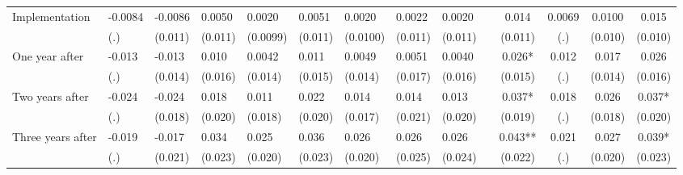 \begin{tabular}{lccccrrrrrcccc}
Implementation & \multicolumn{1}{l}{-0.0084} & \multicolumn{1}{l}{-0.0086} & \multicolumn{1}{l}{0.0050} & \multicolumn{1}{l}{0.0020} & \multicolumn{1}{l}{0.0051} & \multicolumn{1}{l}{0.0020} & \multicolumn{1}{l}{0.0022} & \multicolumn{1}{l}{0.0020} &       & 0.014 & 0.0069 & 0.0100 & 0.015 \\
      & \multicolumn{1}{l}{(.)} & \multicolumn{1}{l}{(0.011)} & \multicolumn{1}{l}{(0.011)} & \multicolumn{1}{l}{(0.0099)} & \multicolumn{1}{l}{(0.011)} & \multicolumn{1}{l}{(0.0100)} & \multicolumn{1}{l}{(0.011)} & \multicolumn{1}{l}{(0.011)} &       & (0.011) & (.)   & (0.010) & (0.010) \\
One year after & \multicolumn{1}{l}{-0.013} & \multicolumn{1}{l}{-0.013} & \multicolumn{1}{l}{0.010} & \multicolumn{1}{l}{0.0042} & \multicolumn{1}{l}{0.011} & \multicolumn{1}{l}{0.0049} & \multicolumn{1}{l}{0.0051} & \multicolumn{1}{l}{0.0040} &       & 0.026* & 0.012 & 0.017 & 0.026 \\
      & \multicolumn{1}{l}{(.)} & \multicolumn{1}{l}{(0.014)} & \multicolumn{1}{l}{(0.016)} & \multicolumn{1}{l}{(0.014)} & \multicolumn{1}{l}{(0.015)} & \multicolumn{1}{l}{(0.014)} & \multicolumn{1}{l}{(0.017)} & \multicolumn{1}{l}{(0.016)} &       & (0.015) & (.)   & (0.014) & (0.016) \\
Two years after & \multicolumn{1}{l}{-0.024} & \multicolumn{1}{l}{-0.024} & \multicolumn{1}{l}{0.018} & \multicolumn{1}{l}{0.011} & \multicolumn{1}{l}{0.022} & \multicolumn{1}{l}{0.014} & \multicolumn{1}{l}{0.014} & \multicolumn{1}{l}{0.013} &       & 0.037* & 0.018 & 0.026 & 0.037* \\
      & \multicolumn{1}{l}{(.)} & \multicolumn{1}{l}{(0.018)} & \multicolumn{1}{l}{(0.020)} & \multicolumn{1}{l}{(0.018)} & \multicolumn{1}{l}{(0.020)} & \multicolumn{1}{l}{(0.017)} & \multicolumn{1}{l}{(0.021)} & \multicolumn{1}{l}{(0.020)} &       & (0.019) & (.)   & (0.018) & (0.020) \\
Three years after & \multicolumn{1}{l}{-0.019} & \multicolumn{1}{l}{-0.017} & \multicolumn{1}{l}{0.034} & \multicolumn{1}{l}{0.025} & \multicolumn{1}{l}{0.036} & \multicolumn{1}{l}{0.026} & \multicolumn{1}{l}{0.026} & \multicolumn{1}{l}{0.026} &       & 0.043** & 0.021 & 0.027 & 0.039* \\
      & \multicolumn{1}{l}{(.)} & \multicolumn{1}{l}{(0.021)} & \multicolumn{1}{l}{(0.023)} & \multicolumn{1}{l}{(0.020)} & \multicolumn{1}{l}{(0.023)} & \multicolumn{1}{l}{(0.020)} & \multicolumn{1}{l}{(0.025)} & \multicolumn{1}{l}{(0.024)} &       & (0.022) & (.)   & (0.020) & (0.023) \\

\end{tabular}
